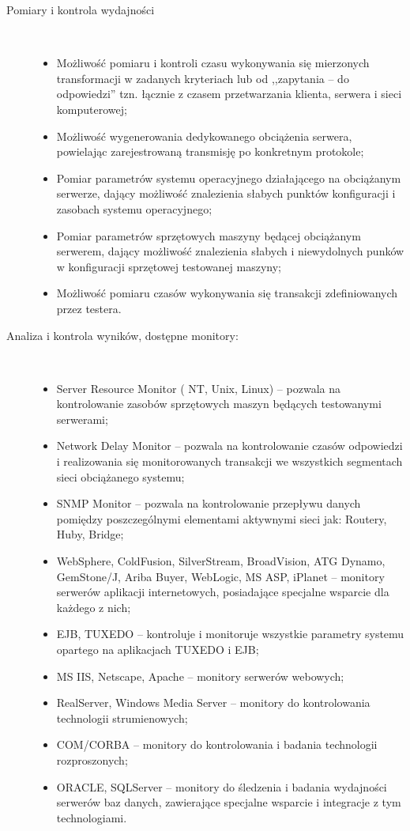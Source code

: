 \begin{description}
\item[Pomiary i kontrola wydajności]\
\begin{itemize}
	\item Możliwość pomiaru i kontroli czasu wykonywania się mierzonych transformacji w zadanych kryteriach lub od ,,zapytania -- 
	do odpowiedzi'' tzn. łącznie z czasem przetwarzania klienta, serwera i sieci komputerowej;
	\item Możliwość wygenerowania dedykowanego obciążenia serwera, powielając zarejestrowaną transmisję po konkretnym protokole;
	\item Pomiar parametrów systemu operacyjnego działającego na obciążanym serwerze, dający możliwość znalezienia słabych punktów 
	konfiguracji i zasobach systemu operacyjnego;
	\item Pomiar parametrów sprzętowych maszyny będącej obciążanym serwerem, dający możliwość znalezienia słabych i niewydolnych 
	punków w konfiguracji sprzętowej testowanej maszyny;
	\item Możliwość pomiaru czasów wykonywania się transakcji zdefiniowanych przez testera.
	\end{itemize}
\item[Analiza i kontrola wyników, dostępne monitory:]\
	\begin{itemize}
	\item Server Resource Monitor ( NT, Unix, Linux) -- pozwala na kontrolowanie zasobów sprzętowych maszyn będących 
	testowanymi serwerami;
	\item Network Delay Monitor -- pozwala na kontrolowanie czasów odpowiedzi i realizowania się monitorowanych transakcji we 
	wszystkich segmentach sieci obciążanego systemu;
	\item SNMP Monitor -- pozwala na kontrolowanie przepływu danych pomiędzy poszczególnymi elementami aktywnymi sieci jak: 
	Routery, Huby, Bridge;
	\item WebSphere, ColdFusion, SilverStream, BroadVision, ATG Dynamo, GemStone/J, Ariba Buyer, WebLogic, MS ASP, iPlanet -- 
	monitory serwerów aplikacji internetowych, posiadające specjalne wsparcie dla każdego z nich;
	\item EJB, TUXEDO -- kontroluje i monitoruje wszystkie parametry systemu opartego na aplikacjach TUXEDO i EJB;
	\item MS IIS, Netscape, Apache -- monitory serwerów webowych;
	\item RealServer, Windows Media Server -- monitory do kontrolowania technologii strumienowych;
	\item COM/CORBA -- monitory do kontrolowania i badania technologii rozproszonych;
	\item ORACLE, SQLServer -- monitory do śledzenia i badania wydajności serwerów baz danych, zawierające specjalne wsparcie i 
	integracje z tym technologiami.
	\end{itemize}


\end{description}
